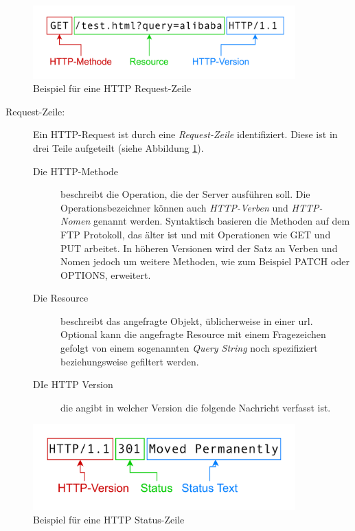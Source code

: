 \begin{figure}[!hbt]
     \centering
     \includegraphics[width=0.9\textwidth]{./images/HTTP-Requestline.png}
     \caption{Beispiel für eine HTTP Request-Zeile}
     \label{fig:http-requestline}
 \end{figure}

\begin{description}
     \item[Request-Zeile:] Ein HTTP-Request ist durch eine \textit{Request-Zeile} identifiziert. Diese ist in drei Teile aufgeteilt (siehe Abbildung \ref{fig:http-requestline}).
     \begin{description}
          \item[Die HTTP-Methode] beschreibt die Operation, die der Server ausführen soll.
          Die Operationsbezeichner können auch \textit{HTTP-Verben} und \textit{HTTP-Nomen} genannt werden.
          Syntaktisch basieren die Methoden auf dem FTP Protokoll, das älter ist und mit Operationen wie GET und PUT arbeitet.
          In höheren Versionen wird der Satz an Verben und Nomen jedoch um weitere Methoden, wie zum Beispiel PATCH oder OPTIONS, erweitert.
          \item[Die Resource] beschreibt das angefragte Objekt, üblicherweise in einer \ac{url}. 
          Optional kann die angefragte Resource mit einem Fragezeichen gefolgt von einem sogenannten \textit{Query String} noch spezifiziert beziehungsweise gefiltert werden.
          \item[DIe HTTP Version] die angibt in welcher Version die folgende Nachricht verfasst ist. 
     \end{description}
\end{description}

\begin{figure}[!hbt]
     \centering
     \includegraphics[width=0.9\textwidth]{./images/HTTP-Statusline.png}
     \caption{Beispiel für eine HTTP Status-Zeile}
     \label{fig:http-statusline}
 \end{figure}


